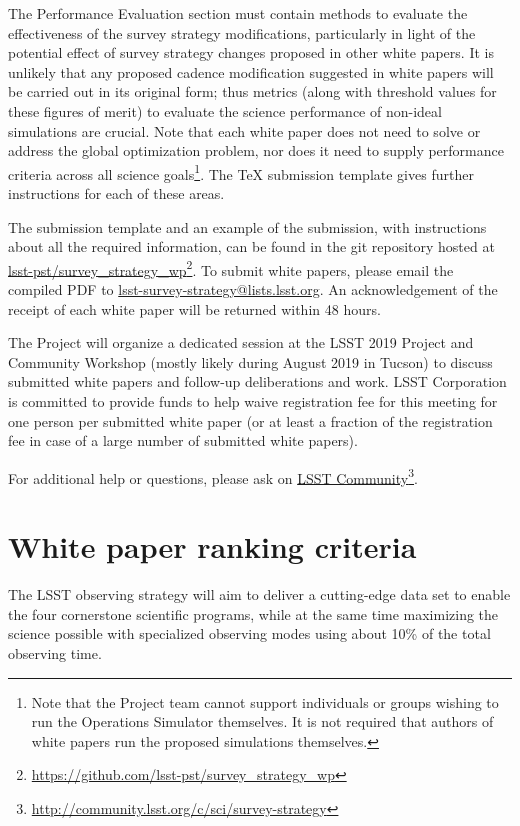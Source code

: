 \documentclass[DM,toc,usenatbib]{lsstdoc}
\begin{document}
The Performance Evaluation section must contain methods to evaluate the effectiveness of the survey strategy modifications, particularly in light of the potential effect of survey strategy changes proposed in other white papers. It is unlikely that any proposed cadence modification suggested in white papers will be carried out in its original form; thus metrics (along with threshold values for these figures of merit) to evaluate the science performance of non-ideal simulations are crucial.  Note that each white paper does not need to solve or address the global optimization problem, nor does it need to supply performance criteria across all science goals\footnote{Note that 
the Project team cannot support individuals or groups wishing to run the Operations Simulator themselves. It is not required that authors of white papers run the proposed simulations themselves.}. The TeX submission template gives further instructions for each of these areas.

The submission template and an example of the submission, with instructions about
all the required information, can be found in the git repository hosted at \href{https://github.com/lsst-pst/survey_strategy_wp}{lsst-pst/survey\_strategy\_wp}\footnote{\url{https://github.com/lsst-pst/survey_strategy_wp}}.
To submit white papers, please email the compiled PDF to \href{lsst-survey-strategy@lists.lsst.org}{lsst-survey-strategy@lists.lsst.org}. An acknowledgement of the receipt of each white paper will be returned within 48 hours.

The Project will organize a dedicated session at the LSST 2019 Project and Community Workshop
(mostly likely during August 2019 in Tucson) to discuss submitted white papers and follow-up
deliberations and work. LSST Corporation is committed to provide funds to help waive registration
fee for this meeting for one person per submitted white paper (or at least a fraction of the registration 
fee in case of a large number of submitted white papers). 

For additional help or questions, please ask on \href{https://community.lsst.org/c/sci}{LSST Community}\footnote{\url{http://community.lsst.org/c/sci/survey-strategy}}. 


\section{White paper ranking criteria \label{sec:ranking}} 

The LSST observing strategy will aim to deliver a cutting-edge data set to enable
the four cornerstone scientific programs, while at the same time maximizing the 
science possible with specialized observing modes using about 10\% of the total observing time. 
\end{document}
